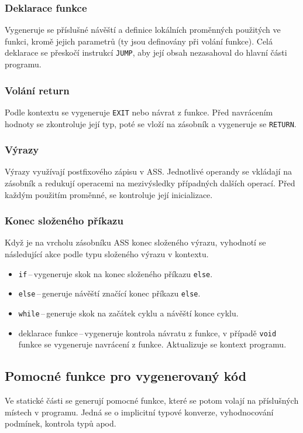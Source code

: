 \documentclass[a4paper, 12pt]{article}
\begin{document}
    \subsubsection{Deklarace funkce}
    Vygeneruje se příslušné návěští a definice lokálních proměnných použitých ve funkci, kromě jejich parametrů (ty jsou definovány při volání funkce). Celá deklarace se přeskočí instrukcí \texttt{JUMP}, aby její obsah nezasahoval do hlavní části programu.

    \subsubsection{Volání return}
    Podle kontextu se vygeneruje \texttt{EXIT} nebo návrat z funkce. Před navrácením hodnoty se zkontroluje její typ, poté se vloží na zásobník a vygeneruje se \texttt{RETURN}.

    \subsubsection{Výrazy}
    Výrazy využívají postfixového zápisu v ASS. Jednotlivé operandy se vkládají na zásobník a redukují operacemi na mezivýsledky případných dalších operací. Před každým použitím proměnné, se kontroluje její inicializace.

    \subsubsection{Konec složeného příkazu} \label{konec slozeneho}
    Když je na vrcholu zásobníku ASS konec složeného výrazu, vyhodnotí se následující akce podle typu složeného výrazu v kontextu.
    \begin{itemize}
        \item \texttt{if}\,--\,vygeneruje skok na konec složeného příkazu \texttt{else}.
        \item \texttt{else}\,--\,generuje návěští značící konec příkazu \texttt{else}.
        \item \texttt{while}\,--\,generuje skok na začátek cyklu a návěští konce cyklu.
        \item deklarace funkce\,--\,vygeneruje kontrola návratu z funkce, v případě \texttt{void} funkce se vygeneruje navrácení z funkce. Aktualizuje se kontext programu.
    \end{itemize}

    \subsection{Pomocné funkce pro vygenerovaný kód} \label{pomocne}
    Ve statické části se generují pomocné funkce, které se potom volají na příslušných místech v programu. Jedná se o implicitní typové konverze, vyhodnocování podmínek, kontrola typů apod.
\end{document}
